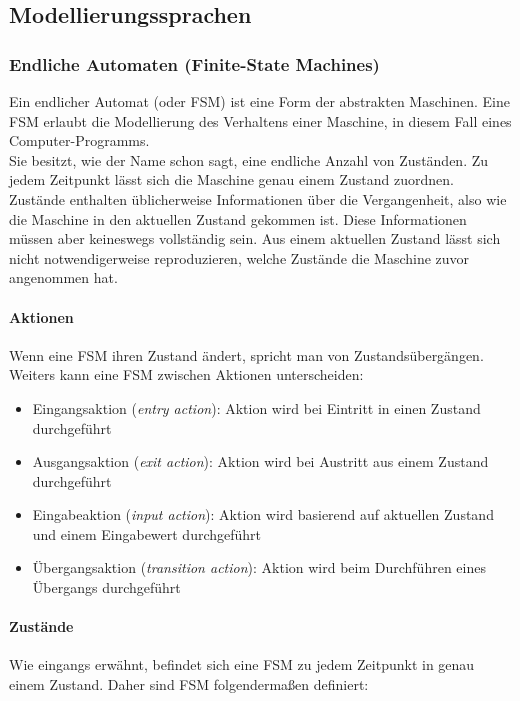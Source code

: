 \subsection{Modellierungssprachen}
\label{sec:notations}
\subsubsection{Endliche Automaten (Finite-State Machines)}
\label{sec:fsm}
Ein endlicher Automat (oder \Gls{FSM}) ist eine Form der abstrakten Maschinen. Eine \Gls{FSM} erlaubt die Modellierung des Verhaltens einer Maschine, in diesem Fall eines Computer-Programms. \cite{wagner_modeling_2006}\\
Sie besitzt, wie der Name schon sagt, eine endliche Anzahl von Zuständen. Zu jedem Zeitpunkt lässt sich die Maschine genau einem Zustand zuordnen. Zustände enthalten üblicherweise Informationen über die Vergangenheit, also wie die Maschine in den aktuellen Zustand gekommen ist. Diese Informationen müssen aber keineswegs vollständig sein. Aus einem aktuellen Zustand lässt sich nicht notwendigerweise reproduzieren, welche Zustände die Maschine zuvor angenommen hat.\\

\paragraph{Aktionen}
Wenn eine \Gls{FSM} ihren Zustand ändert, spricht man von Zustandsübergängen. Weiters kann eine \Gls{FSM} zwischen Aktionen unterscheiden:
\begin{itemize}
\item Eingangsaktion (\textit{entry action}): Aktion wird bei Eintritt in einen Zustand durchgeführt
\item Ausgangsaktion (\textit{exit action}): Aktion wird bei Austritt aus einem Zustand durchgeführt
\item Eingabeaktion (\textit{input action}): Aktion wird basierend auf aktuellen Zustand und einem Eingabewert durchgeführt
\item Übergangsaktion (\textit{transition action}): Aktion wird beim Durchführen eines Übergangs durchgeführt
\end{itemize}

\paragraph{Zustände}
Wie eingangs erwähnt, befindet sich eine \Gls{FSM} zu jedem Zeitpunkt in genau einem Zustand. Daher sind \Gls{FSM} folgendermaßen definiert: 

